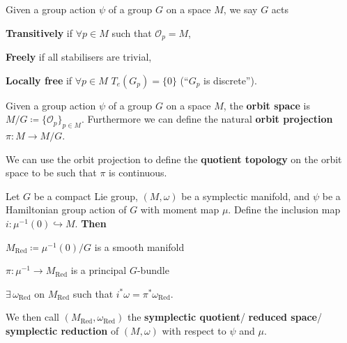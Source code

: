 \documentclass[11pt, final]{article}
\begin{document}
\begin{definition}
	Given a group action $\psi$ of a group $G$ on a space $M$, we say $G$ acts
		\begin{ronumerate}
			\item \textbf{Transitively} if $\forall p \in M$ such that $\mathcal{O}_p = M$,
			\item \textbf{Freely} if all stabilisers are trivial,
			\item \textbf{Locally free} if $\forall p \in M$ $T_e(G_p) = \{ 0 \}$ (\enquote{$G_p$ is discrete}).
		\end{ronumerate}
\end{definition}

\begin{definition}
	Given a group action $\psi$ of a group $G$ on a space $M$, the \textbf{orbit space} is $M/G \coloneqq \{ \mathcal{O}_p \}_{p \in M}$. Furthermore we can define the natural \textbf{orbit projection} $\pi: M \to M/G$.
\end{definition}
\begin{remark}
	We can use the orbit projection to define the \textbf{quotient topology} on the orbit space to be such that $\pi$ is continuous.
\end{remark}

\begin{theorem}
	Let $G$ be a compact Lie group, $(M, \omega)$ be a symplectic manifold, and $\psi$ be a Hamiltonian group action of $G$ with moment map $\mu$. Define the inclusion map $i: \mu^{-1}(0) \hookrightarrow M$. \textbf{Then}
		\begin{ronumerate}
			\item $M_\mathrm{Red} \coloneqq \mu^{-1}(0) / G $ is a smooth manifold
			\item $\pi: \mu^{-1} \to M_\mathrm{Red}$ is a principal $G$-bundle
			\item $\exists \, \omega_\mathrm{Red}$ on $M_\mathrm{Red}$ such that $i^* \omega = \pi^* \omega_\mathrm{Red}$.
		\end{ronumerate}
	We then call $(M_\mathrm{Red}, \omega_\mathrm{Red})$ the \textbf{symplectic quotient}/ \textbf{reduced space}/ \textbf{symplectic reduction} of $(M,\omega)$ with respect to $\psi$ and $\mu$.
\end{theorem}
\end{document}
